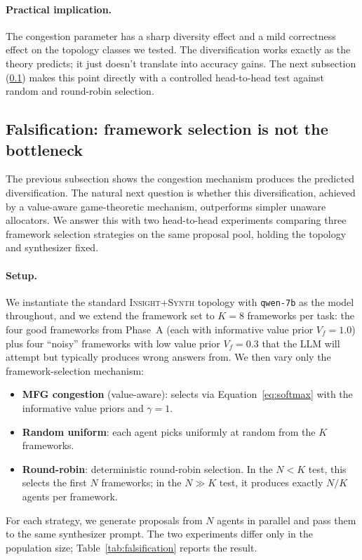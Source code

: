\documentclass[11pt]{amsart}
\newcommand{\g}{\gamma}
\newcommand\1{{\mathds{1}}}
\theoremstyle{definition}
\theoremstyle{remark}
\numberwithin{equation}{section}
\begin{document}
\paragraph{Practical implication.}
The congestion parameter has a sharp diversity effect and a mild correctness effect on the topology classes we tested.
The diversification works exactly as the theory predicts; it just doesn't translate into accuracy gains.
The next subsection (\ref{sec:results-falsification}) makes this point directly with a controlled head-to-head test against random and round-robin selection.

\subsection{Falsification: framework selection is not the bottleneck}\label{sec:results-falsification}

The previous subsection shows the congestion mechanism produces the predicted diversification.
The natural next question is whether this diversification, achieved by a value-aware game-theoretic mechanism, outperforms simpler unaware allocators.
We answer this with two head-to-head experiments comparing three framework selection strategies on the same proposal pool, holding the topology and synthesizer fixed.

\paragraph{Setup.}
We instantiate the standard \textsc{Insight+Synth} topology with \texttt{qwen-7b} as the model throughout, and we extend the framework set to $K\!=\!8$ frameworks per task: the four good frameworks from Phase~A (each with informative value prior $V_f = 1.0$) plus four ``noisy'' frameworks with low value prior $V_f = 0.3$ that the LLM will attempt but typically produces wrong answers from.
We then vary only the framework-selection mechanism:
\begin{itemize}[leftmargin=1.4em, itemsep=2pt]
\item \textbf{MFG congestion} (value-aware): selects via Equation~\eqref{eq:softmax} with the informative value priors and $\g\!=\!1$.
\item \textbf{Random uniform}: each agent picks uniformly at random from the $K$ frameworks.
\item \textbf{Round-robin}: deterministic round-robin selection. In the $N\!<\!K$ test, this selects the first $N$ frameworks; in the $N\!\gg\!K$ test, it produces exactly $N/K$ agents per framework.
\end{itemize}
For each strategy, we generate proposals from $N$ agents in parallel and pass them to the same synthesizer prompt.
The two experiments differ only in the population size; Table~\ref{tab:falsification} reports the result.
\end{document}
